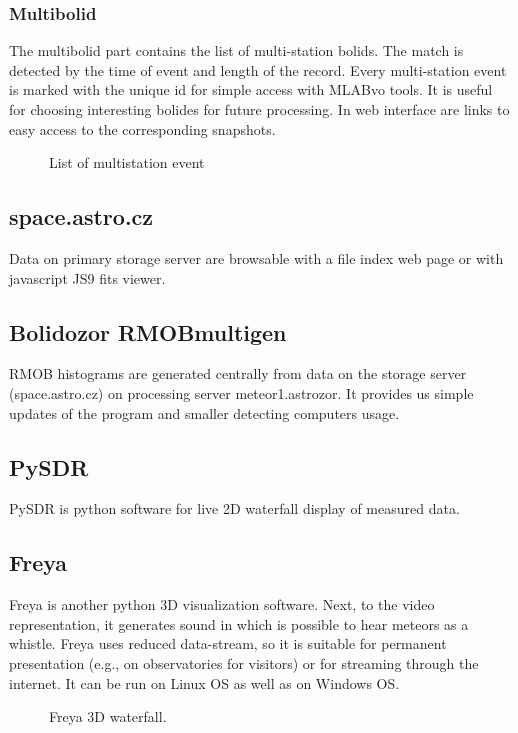 \documentclass[10pt,a4paper,twoside,dvips]{article}
\begin{document}
\begin{IMCpaper}
\subsubsection{Multibolid}
The multibolid part contains the list of multi-station bolids. The match is detected by the time of event and length of the record. Every multi-station event is marked with the unique id for simple access with MLABvo tools. It is useful for choosing interesting bolides for future processing. In web interface are links to easy access to the corresponding snapshots.


\begin{figure}[htb]
\centering
{}
\caption{List of multistation event}%
\label{RTBb}
\end{figure}

\subsection{space.astro.cz}
Data on primary storage server are browsable with a file index web page or with javascript JS9 fits viewer.                                                     

\subsection{Bolidozor RMOBmultigen}
RMOB histograms are generated centrally from data on the storage server (space.astro.cz) on processing server meteor1.astrozor. It provides us simple updates of the program and smaller detecting computers usage.                                                         


\subsection{PySDR}
PySDR is python software for live 2D waterfall display of measured data.                                                  
\subsection{Freya}
Freya is another python 3D visualization software. Next, to the video representation, it generates sound in which is possible to hear meteors as a whistle. Freya uses reduced data-stream, so it is suitable for permanent presentation (e.g., on observatories for visitors) or for streaming through the internet. It can be run on Linux OS as well as on Windows OS.                                                                                    

\begin{figure}[htb]
\centering
{}
\caption{Freya 3D waterfall.}%
\label{RTBmmap}
\end{figure}

                                                                                                                           
%
%

\end{IMCpaper}
\end{document}
